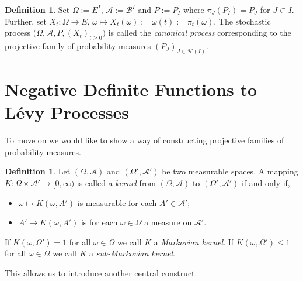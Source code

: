\documentclass[a4paper, 12pt]{report}
\theoremstyle{remark}
\theoremstyle{definition}
\newtheorem{definition}[theorem]{Definition}
\begin{document}
\begin{definition}\label{FAaSSPD4}
Set $\Omega := E^I$, $\mathcal{A} := \mathcal{B}^I$ and $P := P_I$ where $\pi_J(P_I) = P_J$ for $J \subset I$.  Further, set $X_t : \Omega \to E$, $\omega \mapsto X_t(\omega) := \omega(t) := \pi_t(\omega)$.  The stochastic process $\big(\Omega, \mathcal{A}, P, (X_t)_{t \ge 0}\big)$ is called the \emph{canonical process} corresponding to the projective family of probability measures $(P_J)_{J \in \mathcal{H}(I)}$.
\end{definition}


\section{Negative Definite Functions to L\'evy Processes}\label{Se.NDFtLP}

To move on we would like to show a way of constructing projective families of probability measures.

\begin{definition}
Let $(\Omega, \mathcal{A})$ and $(\Omega', \mathcal{A}')$ be two measurable spaces.  A mapping $K : \Omega \times \mathcal{A}' \to [0, \infty)$ is called a \emph{kernel} from $(\Omega, \mathcal{A})$ to $(\Omega', \mathcal{A}')$ if and only if,
\begin{itemize}
\item[Ki)] $\omega \mapsto K(\omega, A')$ is measurable for each $A' \in \mathcal{A}'$;

\item[Kii)] $A' \mapsto K(\omega, A')$ is for each $\omega \in \Omega$ a measure on $\mathcal{A}'$.
\end{itemize}
If $K(\omega, \Omega') = 1$ for all $\omega \in \Omega$ we call $K$ a \emph{Markovian kernel}.  If $K(\omega, \Omega') \le 1$ for all $\omega \in \Omega$ we call $K$ a \emph{sub-Markovian kernel}.
\end{definition}
This allows us to introduce another central construct.
\end{document}
